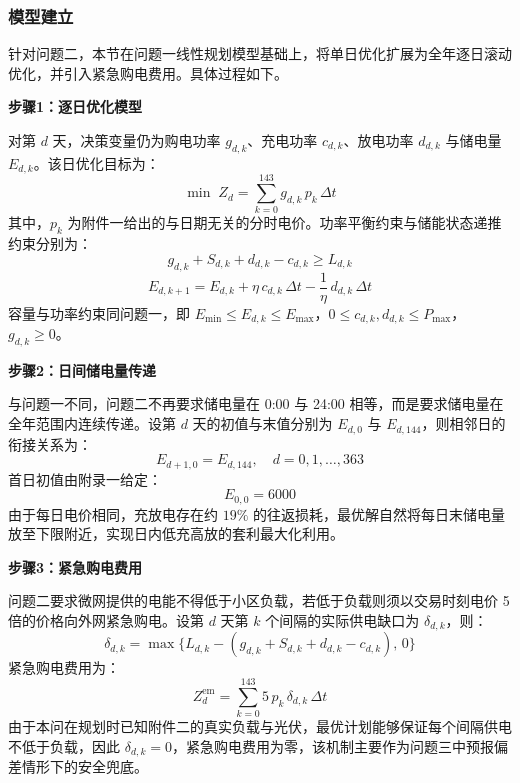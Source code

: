 
\subsubsection{模型建立}

针对问题二，本节在问题一线性规划模型基础上，将单日优化扩展为全年逐日滚动优化，并引入紧急购电费用。具体过程如下。

\textbf{步骤1：逐日优化模型}

对第 $d$ 天，决策变量仍为购电功率 $g_{d,k}$、充电功率 $c_{d,k}$、放电功率 $d_{d,k}$ 与储电量 $E_{d,k}$。该日优化目标为：
\begin{equation}
    \min \; Z_d=\sum_{k=0}^{143} g_{d,k}\,p_k\,\Delta t
\end{equation}
其中，$p_k$ 为附件一给出的与日期无关的分时电价。功率平衡约束与储能状态递推约束分别为：
\begin{equation}
    g_{d,k}+S_{d,k}+d_{d,k}-c_{d,k}\geq L_{d,k}
\end{equation}
\begin{equation}
    E_{d,k+1}=E_{d,k}+\eta\,c_{d,k}\,\Delta t-\frac{1}{\eta}\,d_{d,k}\,\Delta t
\end{equation}
容量与功率约束同问题一，即 $E_{\min}\leq E_{d,k}\leq E_{\max}$，$0\leq c_{d,k},d_{d,k}\leq P_{\max}$，$g_{d,k}\geq 0$。

\textbf{步骤2：日间储电量传递}

与问题一不同，问题二不再要求储电量在 0:00 与 24:00 相等，而是要求储电量在全年范围内连续传递。设第 $d$ 天的初值与末值分别为 $E_{d,0}$ 与 $E_{d,144}$，则相邻日的衔接关系为：
\begin{equation}
    E_{d+1,0}=E_{d,144},\quad d=0,1,\dots,363
\end{equation}
首日初值由附录一给定：
\begin{equation}
    E_{0,0}=6000
\end{equation}
由于每日电价相同，充放电存在约 $19\%$ 的往返损耗，最优解自然将每日末储电量放至下限附近，实现日内低充高放的套利最大化利用\cite{sioshansi2010}。

\textbf{步骤3：紧急购电费用}

问题二要求微网提供的电能不得低于小区负载，若低于负载则须以交易时刻电价 5 倍的价格向外网紧急购电。设第 $d$ 天第 $k$ 个间隔的实际供电缺口为 $\delta_{d,k}$，则：
\begin{equation}
    \delta_{d,k}=\max\{L_{d,k}-(g_{d,k}+S_{d,k}+d_{d,k}-c_{d,k}),\,0\}
\end{equation}
紧急购电费用为：
\begin{equation}
    Z^{\mathrm{em}}_d=\sum_{k=0}^{143} 5\,p_k\,\delta_{d,k}\,\Delta t
\end{equation}
由于本问在规划时已知附件二的真实负载与光伏，最优计划能够保证每个间隔供电不低于负载，因此 $\delta_{d,k}=0$，紧急购电费用为零，该机制主要作为问题三中预报偏差情形下的安全兜底。

